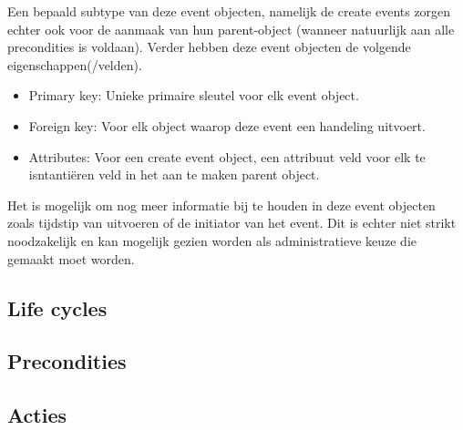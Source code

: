 Een bepaald subtype van deze event objecten, namelijk de create events zorgen echter ook voor de aanmaak van hun parent-object (wanneer natuurlijk aan alle precondities is voldaan).
Verder hebben deze event objecten de volgende eigenschappen(/velden).
\begin{itemize}
	\item Primary key: Unieke primaire sleutel voor elk event object.
	\item Foreign key: Voor elk object waarop deze event een handeling uitvoert.
	\item Attributes: Voor een create event object, een attribuut veld voor elk te isntanti\"eren veld in het aan te maken parent object.
\end{itemize}

Het is mogelijk om nog meer informatie bij te houden in deze event objecten zoals tijdstip van uitvoeren of de initiator van het event. Dit is echter niet strikt noodzakelijk en kan mogelijk gezien worden als administratieve keuze die gemaakt moet worden.
\subsection{Life cycles}
\label{sec:Life_cycles}
\subsection{Precondities}
\label{sec:precondities}
\subsection{Acties}
\label{sec:acties}
